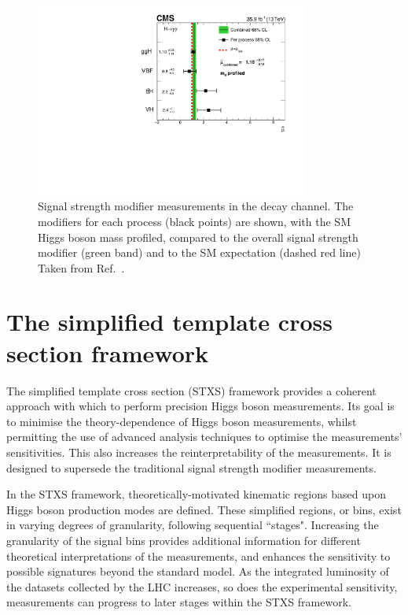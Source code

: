 \begin{figure}[hptb]
  \centering
  \includegraphics[width=0.8\textwidth]{Figures/Theory/PerProcTrad.pdf}
  \caption[Per process signal strength modifier measurements from Ref.~\cite{HIG-16-040}.]
  {
    Signal strength modifier measurements in the \Hgg decay channel.
    The modifiers for each process (black points) are shown, with the SM Higgs boson mass profiled, 
    compared to the overall signal strength modifier (green band) 
    and to the SM expectation (dashed red line)
    Taken from Ref.~\cite{HIG-16-040}.
  }
  \label{fig:theory_PerProcTrad}
\end{figure}

\section{The simplified template cross section framework}

The simplified template cross section (STXS) framework \cite{YR4}
provides a coherent approach with which to perform precision Higgs boson measurements. 
Its goal is to minimise the theory-dependence of Higgs boson measurements, 
whilst permitting the use of advanced analysis techniques to optimise the measurements' sensitivities.
This also increases the reinterpretability of the measurements.
It is designed to supersede the traditional signal strength modifier measurements.

In the STXS framework, 
theoretically-motivated kinematic regions based upon Higgs boson production modes are defined.
These simplified regions, or bins, exist in varying degrees of granularity, 
following sequential ``stages".
Increasing the granularity of the signal bins 
provides additional information for different theoretical interpretations of the measurements, 
and enhances the sensitivity to possible signatures beyond the standard model.
As the integrated luminosity of the datasets collected by the LHC increases, 
so does the experimental sensitivity,
measurements can progress to later stages within the STXS framework.

